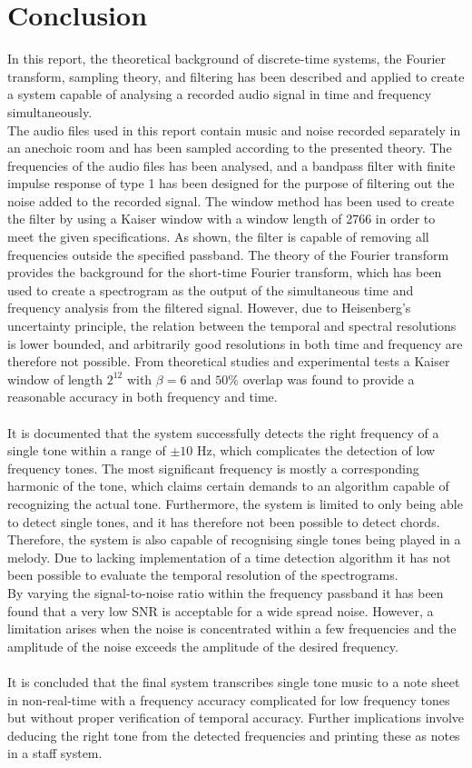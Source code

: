 \chapter{Conclusion}
In this report, the theoretical background of discrete-time systems, the Fourier transform, sampling theory, and filtering has been described and applied to create a system capable of analysing a recorded audio signal in time and frequency simultaneously.
\\
The audio files used in this report contain music and noise recorded separately in an anechoic room and has been sampled according to the presented theory. The frequencies of the audio files has been analysed, and a bandpass filter with finite impulse response of type 1 has been designed for the purpose of filtering out the noise added to the recorded signal. The window method has been used to create the filter by using a Kaiser window with a window length of 2766 in order to meet the given specifications. As shown, the filter is capable of removing all frequencies outside the specified passband. The theory of the Fourier transform provides the background for the short-time Fourier transform, which has been used to create a spectrogram as the output of the simultaneous time and frequency analysis from the filtered signal. However, due to Heisenberg's uncertainty principle, the relation between the temporal and spectral resolutions is lower bounded, and arbitrarily good resolutions in both time and frequency are therefore not possible. From theoretical studies and experimental tests a Kaiser window of length $2^{12}$ with $\beta = 6$ and $50\%$ overlap was found to provide a reasonable accuracy in both frequency and time.
\\ \\
It is documented that the system successfully detects the right frequency of a single tone within a range of $\pm 10$ Hz, which complicates the detection of low frequency tones. The most significant frequency is mostly a corresponding harmonic of the tone, which claims certain demands to an algorithm capable of recognizing the actual tone. Furthermore, the system is limited to only being able to detect single tones, and it has therefore not been possible to detect chords. Therefore, the system is also capable of recognising single tones being played in a melody. Due to lacking implementation of a time detection algorithm it has not been possible to evaluate the temporal resolution of the spectrograms.
\\
By varying the signal-to-noise ratio within the frequency  passband it has been found that a very low SNR is acceptable for a wide spread noise. However, a limitation arises when the noise is concentrated within a few frequencies and the amplitude of the noise exceeds the amplitude of the desired frequency.
\\ \\
It is concluded that the final system transcribes single tone music to a note sheet in non-real-time with a frequency accuracy complicated for low frequency tones but without proper verification of temporal accuracy. Further implications involve deducing the right tone from the detected frequencies and printing these as notes in a staff system.

 